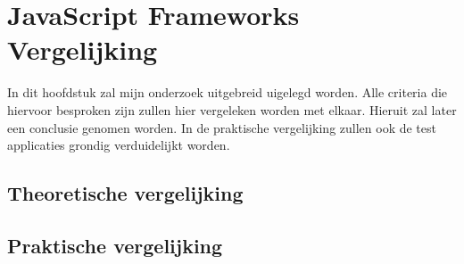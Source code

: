 
\chapter{JavaScript Frameworks Vergelijking}
\label{ch:onderzoek}

In dit hoofdstuk zal mijn onderzoek uitgebreid uigelegd worden. Alle criteria die hiervoor besproken zijn zullen hier vergeleken worden met elkaar. Hieruit zal later een conclusie genomen worden. In de praktische vergelijking zullen ook de test applicaties grondig verduidelijkt worden.

\section{Theoretische vergelijking}
\label{ch:theoretische_vergelijking}

\section{Praktische vergelijking}
\label{ch:praktische_vergelijking}